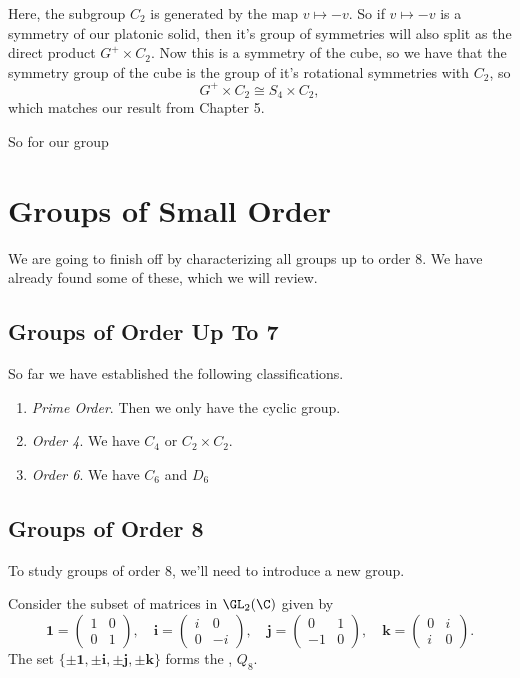 \documentclass[a4]{scrreprt}
\begin{document}
Here, the subgroup $C_2$ is generated by the map $v \mapsto -v$. So if $v \mapsto -v$ is a symmetry of our platonic solid, then it's group of symmetries will also split as the direct product $G^+ \times C_2$. Now this is a symmetry of the cube, so we have that the symmetry group of the cube is the group of it's rotational symmetries with $C_2$, so
$$
G^+ \times C_2 \cong S_4 \times C_2,
$$
which matches our result from Chapter 5.



So for our group





\chapter{Groups of Small Order}

We are going to finish off by characterizing all groups up to order 8. We have already found some of these, which we will review.

\section{Groups of Order Up To 7}

So far we have established the following classifications.

\begin{enumerate}
	\item \emph{Prime Order}. Then we only have the cyclic group.
	\item \emph{Order 4}. We have $C_4$ or $C_2 \times C_2$.
	\item \emph{Order 6}. We have $C_6$ and $D_6$
\end{enumerate}

\section{Groups of Order 8}

To study groups of order 8, we'll need to introduce a new group.

\begin{definition}[Quaternions]
	Consider the subset of matrices in $\GL_2(\C)$ given by
	$$
	\mathbf{1} = \begin{pmatrix}
		1 & 0 \\ 0 & 1
	\end{pmatrix}, \quad  \mathbf{i} = \begin{pmatrix}
		i & 0 \\ 0 & -i
	\end{pmatrix}, \quad \mathbf{j} = \begin{pmatrix}
		0 & 1 \\ -1 & 0
	\end{pmatrix}, \quad \mathbf{k} = \begin{pmatrix}
		0 & i \\ i & 0
	\end{pmatrix}.
	$$
	The set $\{\pm\mathbf{1}, \pm\mathbf{i}, \pm\mathbf{j}, \pm\mathbf{k}\}$ forms the , $Q_8$.
\end{definition}
\end{document}

